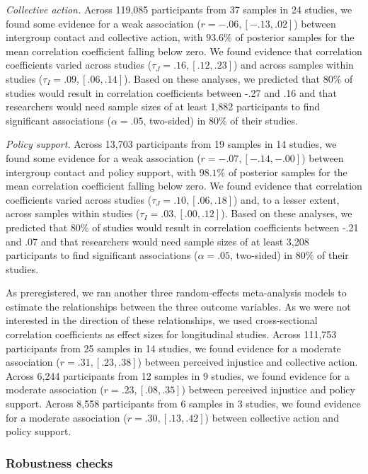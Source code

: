 \documentclass[twocolumn, 10pt, letterpaper]{article}
\begin{document}
\emph{Collective action.} Across 119,085 participants from 37 samples in
24 studies, we found some evidence for a weak association
(\(r = -.06, [-.13, .02]\)) between intergroup contact and collective
action, with \(93.6\%\) of posterior samples for the mean correlation
coefficient falling below zero. We found evidence that correlation
coefficients varied across studies (\(\tau_J = .16, [.12, .23]\)) and
across samples within studies (\(\tau_I = .09, [.06, .14]\)). Based on
these analyses, we predicted that 80\% of studies would result in
correlation coefficients between -.27 and .16 and that researchers would
need sample sizes of at least 1,882 participants to find significant
associations (\(\alpha = .05\), two-sided) in 80\% of their studies.

\emph{Policy support.} Across 13,703 participants from 19 samples in 14
studies, we found some evidence for a weak association
(\(r = -.07, [-.14, -.00]\)) between intergroup contact and policy
support, with \(98.1\%\) of posterior samples for the mean correlation
coefficient falling below zero. We found evidence that correlation
coefficients varied across studies (\(\tau_J = .10, [.06, .18]\)) and,
to a lesser extent, across samples within studies
(\(\tau_I = .03, [.00, .12]\)). Based on these analyses, we predicted
that 80\% of studies would result in correlation coefficients between
-.21 and .07 and that researchers would need sample sizes of at least
3,208 participants to find significant associations (\(\alpha = .05\),
two-sided) in 80\% of their studies.

As preregistered, we ran another three random-effects meta-analysis
models to estimate the relationships between the three outcome
variables. As we were not interested in the direction of these
relationships, we used cross-sectional correlation coefficients as
effect sizes for longitudinal studies. Across 111,753 participants from
25 samples in 14 studies, we found evidence for a moderate association
(\(r = .31, [.23, .38]\)) between perceived injustice and collective
action. Across 6,244 participants from 12 samples in 9 studies, we found
evidence for a moderate association (\(r = .23, [.08, .35]\)) between
perceived injustice and policy support. Across 8,558 participants from 6
samples in 3 studies, we found evidence for a moderate association
(\(r = .30, [.13, .42]\)) between collective action and policy support.

\hypertarget{robustness-checks}{%
\subsubsection{Robustness checks}\label{robustness-checks}}
\end{document}
